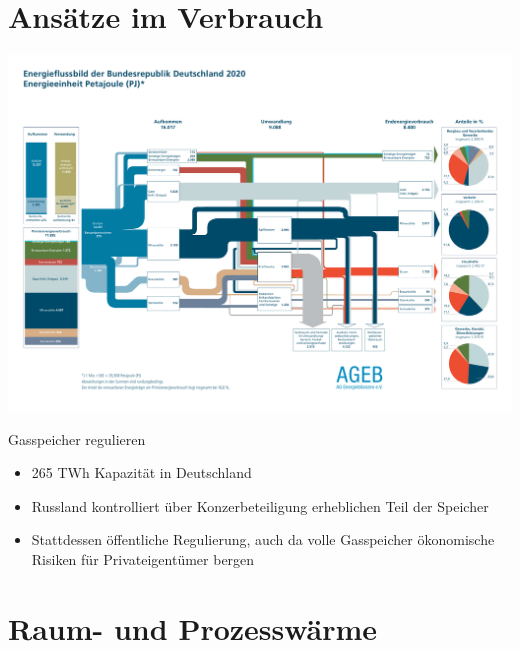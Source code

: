 \documentclass[10pt]{beamer}
\begin{document}
\section{Ansätze im Verbrauch}

\begin{frame}
\includegraphics[width=1.1\textwidth]{fig/Energieflussbild-2020_PJ_lang_DE_20220401}

\end{frame}

\begin{frame}{Gasspeicher regulieren}
  \begin{itemize}
    \item 265 TWh Kapazität in Deutschland 
    \item Russland kontrolliert über Konzerbeteiligung erheblichen Teil der Speicher
    \item Stattdessen öffentliche Regulierung, 
      auch da volle Gasspeicher ökonomische Risiken für Privateigentümer bergen 
  \end{itemize}
\end{frame}

\section{Raum- und Prozesswärme}
\end{document}
